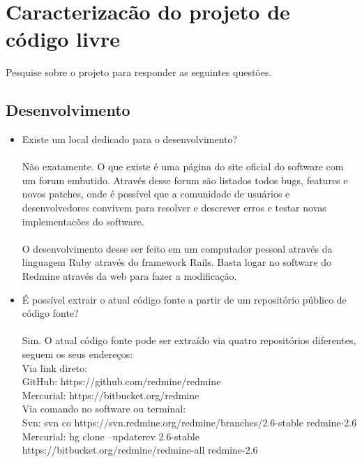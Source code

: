 \documentclass[12pt,a4paper]{article} %
\begin{document}
\section{Caracterizac\~ao do projeto de c\'odigo livre} 
Pesquise sobre o projeto para responder as seguintes quest\~oes.


\subsection{Desenvolvimento}


\begin{itemize}
\item Existe um local dedicado para o desenvolvimento?\\
\\
N\~ao exatamente. O que existe \'e uma p\'agina do site oficial do software com um forum embutido. Atrav\'es desse forum s\~ao listados todos bugs, features e novos patches, onde \'e poss\'ivel que a comunidade de usu\'arios e desenvolvedores convivem para resolver e descrever erros e testar novas implementac\~oes do software.\\
\\
O desenvolvimento desse ser feito em um computador pessoal atrav\'es da linguagem Ruby atrav\'es do framework Rails. Basta logar no software do Redmine através da web para fazer a modificação.

\item \'E poss\'ivel extrair o atual c\'odigo fonte a partir de um reposit\'orio p\'ublico de c\'odigo fonte?\\
\\
Sim. O atual c\'odigo fonte pode ser extra\'ido via quatro reposit\'orios diferentes, seguem os seus endereços:\\
Via link direto:\\
GitHub: https://github.com/redmine/redmine\\
Mercurial: https://bitbucket.org/redmine\\

Via comando no software ou terminal:\\
Svn: svn co https://svn.redmine.org/redmine/branches/2.6-stable redmine-2.6\\
Mercurial: hg clone --updaterev 2.6-stable https://bitbucket.org/redmine/redmine-all redmine-2.6\\



\end{itemize}
\end{document}
